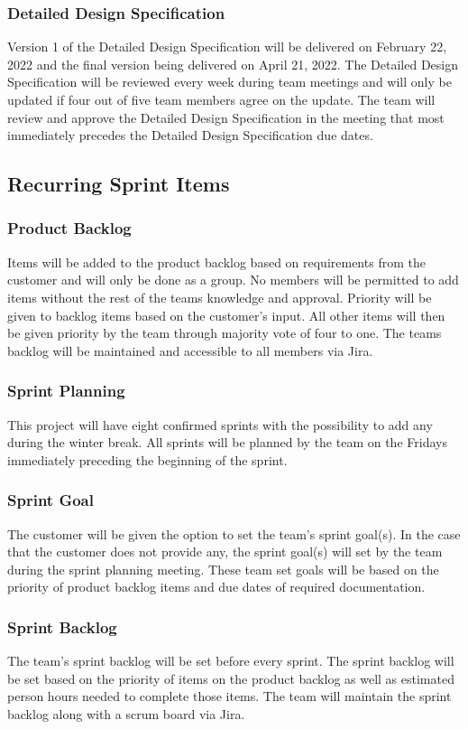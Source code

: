 \subsubsection{Detailed Design Specification}
Version 1 of the Detailed Design Specification will be delivered on February 22, 2022 and the final version being delivered on April 21, 2022. The Detailed Design Specification will be reviewed every week during team meetings and will only be updated if four out of five team members agree on the update. The team will review and approve the Detailed Design Specification in the meeting that most immediately precedes the Detailed Design Specification due dates.

\subsection{Recurring Sprint Items}
\subsubsection{Product Backlog}
Items will be added to the product backlog based on requirements from the customer and will only be done as a group. No members will be permitted to add items without the rest of the teams knowledge and approval. Priority will be given to backlog items based on the customer's input. All other items will then be given priority by the team through majority vote of four to one. The teams backlog will be maintained and accessible to all members via Jira. 

\subsubsection{Sprint Planning}
This project will have eight confirmed sprints with the possibility to add any during the winter break. All sprints will be planned by the team on the Fridays immediately preceding the beginning of the sprint. 

\subsubsection{Sprint Goal}
The customer will be given the option to set the team's sprint goal(s). In the case that the customer does not provide any, the sprint goal(s) will set by the team during the sprint planning meeting. These team set goals will be based on the priority of product backlog items and due dates of required documentation.

\subsubsection{Sprint Backlog}
The team's sprint backlog will be set before every sprint. The sprint backlog will be set based on the priority of items on the product backlog as well as estimated person hours needed to complete those items. The team will maintain the sprint backlog along with a scrum board via Jira.

